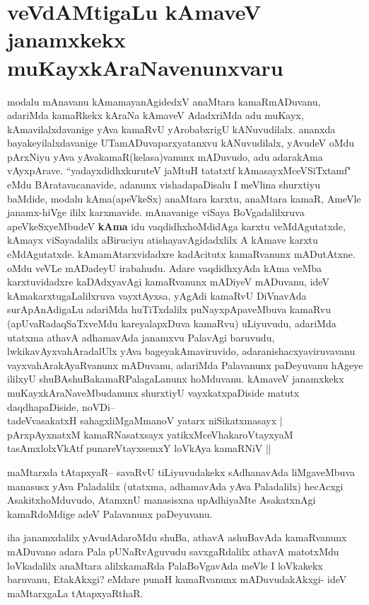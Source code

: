 \section*{veVdAMtigaLu kAmaveV janamxkekx muKayxkAraNavenunxvaru}


\begin{artha}
modalu mAnavanu kAmamayanAgidedxV anaMtara kamaRmADuvanu, adariMda kamaRkekx kAraNa kAmaveV AdadxriMda adu muKayx, kAmavilalxdavanige yAva kamaRvU yArobabxrigU kANuvudilalx. ananxda bayakeyilalxdavanige UTamADuvaparxyatanxvu kANuvudilalx, yAvudeV oMdu pArxNiyu  yAva yAvakamaR(kelasa)vanunx mADuvudo, adu adarakAma vAyxpArave. ``yadayxdidhxkuruteV jaMtuH tatatxtf kAmasayxMceVSiTxtamf" eMdu BAratavacanavide, adanunx vishadapaDisalu I meVlina shurxtiyu baMdide, modalu kAma(apeVkeSx) anaMtara karxtu, anaMtara kamaR, AmeVle janamx-hiVge ililx karxmavide.
mAnavanige viSaya BoVgadalilxruva apeVkeSxyeMbudeV \textbf{kAma} idu vaqdidhxhoMdidAga karxtu veMdAgutatxde, kAmayx viSayadalilx aBiruciyu atishayavAgidadxlilx A kAmave karxtu eMdAgutatxde. kAmamAtarxvidadxre kadAcitutx kamaRvanunx mADutAtxne. oMdu veVLe  mADadeyU irabahudu. Adare vaqdidhxyAda kAma veMba karxtuvidadxre kaDAdxyavAgi kamaRvanunx mADiyeV mADuvanu, ideV kAmakarxtugaLalilxruva vayxtAyxsa, yAgAdi kamaRvU DiVnavAda surApAnAdigaLu adariMda huTiTxdalilx puNayxpApaveMbuva kamaRvu (apUvaRadaqSaTxveMdu kareyalapxDuva kamaRvu) uLiyuvudu, adariMda utatxma athavA adhamavAda janamxvu PalavAgi baruvudu, lwkikavAyxvahAradalUlx yAva bageyakAmaviruvido, adaranishacxyaviruvavanu vayxvahArakAyaRvanunx mADuvanu, adariMda Palavanunx paDeyuvanu hAgeye ililxyU shuBAshuBakamaRPalagaLanunx hoMduvanu. kAmaveV janamxkekx muKayxkAraNaveMbudanunx shurxtiyU vayxkatxpaDiside matutx daqdhapaDiside, noVDi{\rm --}\\
tadeVvasakatxH sahagxliMgaMmanoV yatarx niSikatxmasayx |\\
pArxpAyxnatxM kamaRNasatxsayx yatikxMceVhakaroVtayxyaM\\ 
tasAmxlolxVkAtf punareVtayxsemxY loVkAya kamaRNiV ||
\end{artha}

\begin{artha}
maMtarxda tAtapxyaR{\rm --} savaRvU tiLiyuvudakekx sAdhanavAda liMgaveMbuva manasusx yAva Paladalilx (utatxma, adhamavAda yAva Paladalilx) hecAcxgi AsakitxhoMduvudo, AtamxnU manasisxna upAdhiyaMte AsakatxnAgi kamaRdoMdige adeV Palavanunx paDeyuvanu.

iha janamxdalilx yAvudAdaroMdu shuBa, athavA ashuBavAda kamaRvanunx mADuvano adara Pala pUNaRvAguvudu savxgaRdalilx athavA matotxMdu loVkadalilx anaMtara alilxkamaRda PalaBoVgavAda meVle I loVkakekx baruvanu, EtakAkxgi? eMdare punaH kamaRvanunx mADuvudakAkxgi- ideV maMtarxgaLa tAtapxyaRthaR.
\end{artha}

